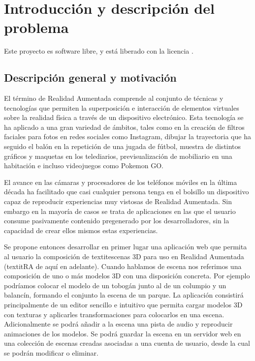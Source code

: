 \chapter{Introducción y descripción del problema}

Este proyecto es software libre, y está liberado con la licencia \cite{gplv3}.


\section{Descripción general y motivación}

El término de Realidad Aumentada comprende al conjunto de técnicas y tecnologías que permiten la superposición e interacción de elementos virtuales sobre la realidad física a través de un dispositivo electrónico. Esta tecnología se ha aplicado a una gran variedad de ámbitos, tales como en la creación de filtros faciales para fotos en redes sociales como Instagram, dibujar la trayectoria que ha seguido el balón en la repetición de una jugada de fútbol, muestra de distintos gráficos y maquetas en los telediarios, previsualización de mobiliario en una habitación e incluso videojuegos como Pokemon GO.

El avance en las cámaras y procesadores de los teléfonos móviles en la última década ha facilitado que casi cualquier persona tenga en el bolsillo un dispositivo capaz de reproducir experiencias muy vistosas de Realidad Aumentada. Sin embargo en la mayoría de casos se trata de aplicaciones en las que el usuario consume pasivamente contenido pregenerado por los desarrolladores, sin la capacidad de crear ellos mismos estas experiencias.

Se propone entonces desarrollar en primer lugar una aplicación web que permita al usuario la composición de textit{escenas 3D} para uso en Realidad Aumentada (textit{RA} de aquí en adelante). Cuando hablamos de escena nos referimos una composición de uno o más modelos 3D con una disposición concreta. Por ejemplo podríamos colocar el modelo de un tobogán junto al de un columpio y un balancín, formando el conjunto la escena de un parque. La aplicación consistirá principalmente de un editor sencillo e intuitivo que permita cargar modelos 3D con texturas y aplicarles transformaciones para colocarlos en una escena. Adicionalmente se podrá añadir a la escena una pista de audio y reproducir animaciones de los modelos. Se podrá guardar la escena en un servidor web en una colección de escenas creadas asociadas a una cuenta de usuario, desde la cual se podrán modificar o eliminar.

